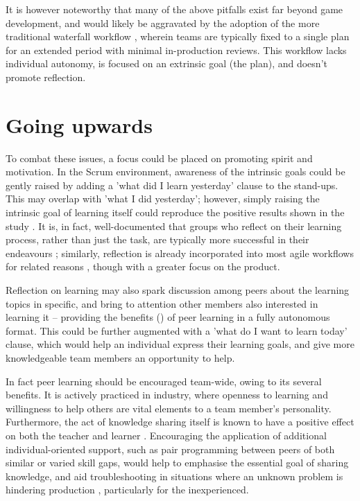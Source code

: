\documentclass{scrartcl}
\begin{document}
It is however noteworthy that many of the above pitfalls exist far beyond game development, and would likely be aggravated by the adoption of the more traditional waterfall workflow \cite{waterfall}, wherein teams are typically fixed to a single plan for an extended period with minimal in-production reviews. This workflow lacks individual autonomy, is focused on an extrinsic goal (the plan), and doesn't promote reflection.

\section{Going upwards}
To combat these issues, a focus could be placed on promoting spirit and motivation. In the Scrum environment, awareness of the intrinsic goals could be gently raised by adding a 'what did I learn yesterday' clause to the stand-ups. This may overlap with 'what I did yesterday'; however, simply raising the intrinsic goal of learning itself could reproduce the positive results shown in the study \cite{motivation}. It is, in fact, well-documented that groups who reflect on their learning process, rather than just the task, are typically more successful in their endeavours \cite{effectivegroups, learnreflection}; similarly, reflection is already incorporated into most agile workflows for related reasons \cite{agile, scrum}, though with a greater focus on the product.

Reflection on learning may also spark discussion among peers about the learning topics in specific, and bring to attention other members also interested in learning it -- providing the benefits (\cite{collaboration, motivation, group2005}) of peer learning in a fully autonomous format. This could be further augmented with a 'what do I want to learn today' clause, which would help an individual express their learning goals, and give more knowledgeable team members an opportunity to help.

In fact peer learning should be encouraged team-wide, owing to its several benefits. It is actively practiced in industry, where openness to learning \cite{devstudy} and willingness to help others \cite{collaboration} are vital elements to a team member's personality. Furthermore, the act of knowledge sharing itself is known to have a positive effect on both the teacher and learner \cite{activepassive, motivation}. Encouraging the application of additional individual-oriented support, such as pair programming between peers of both similar or varied skill gaps, would help to emphasise the essential goal of sharing knowledge, and aid troubleshooting in situations where an unknown problem is hindering production \cite{collaboration, motivation}, particularly for the inexperienced.
\end{document}
